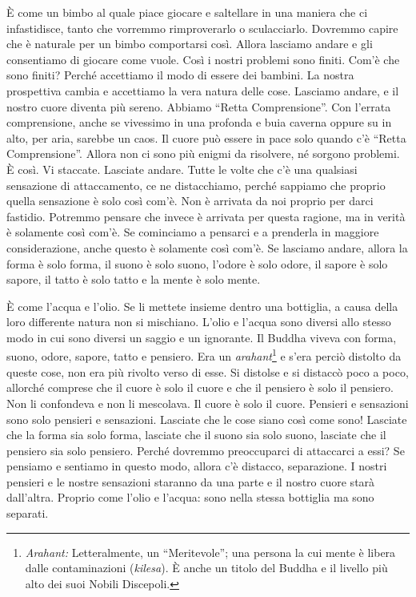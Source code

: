 È come un bimbo al quale piace giocare e saltellare in una maniera che
ci infastidisce, tanto che vorremmo rimproverarlo o sculacciarlo.
Dovremmo capire che è naturale per un bimbo comportarsi così. Allora
lasciamo andare e gli consentiamo di giocare come vuole. Così i nostri
problemi sono finiti. Com'è che sono finiti? Perché accettiamo il modo
di essere dei bambini. La nostra prospettiva cambia e accettiamo la vera
natura delle cose. Lasciamo andare, e il nostro cuore diventa più
sereno. Abbiamo ``Retta Comprensione''. Con l'errata comprensione, anche
se vivessimo in una profonda e buia caverna oppure su in alto, per aria,
sarebbe un caos. Il cuore può essere in pace solo quando c'è ``Retta
Comprensione''. Allora non ci sono più enigmi da risolvere, né sorgono
problemi. È così. Vi staccate. Lasciate andare. Tutte le volte che c'è
una qualsiasi sensazione di attaccamento, ce ne distacchiamo, perché
sappiamo che proprio quella sensazione è solo così com'è. Non è arrivata
da noi proprio per darci fastidio. Potremmo pensare che invece è
arrivata per questa ragione, ma in verità è solamente così com'è. Se
cominciamo a pensarci e a prenderla in maggiore considerazione, anche
questo è solamente così com'è. Se lasciamo andare, allora la forma è
solo forma, il suono è solo suono, l'odore è solo odore, il sapore è
solo sapore, il tatto è solo tatto e la mente è solo mente.

È come l'acqua e l'olio. Se li mettete insieme dentro una bottiglia, a
causa della loro differente natura non si mischiano. L'olio e l'acqua
sono diversi allo stesso modo in cui sono diversi un saggio e un
ignorante. Il Buddha viveva con forma, suono, odore, sapore, tatto e
pensiero. Era un \emph{arahant}\footnote{\emph{Arahant:} Letteralmente,
  un ``Meritevole''; una persona la cui mente è libera dalle
  contaminazioni (\emph{kilesa}). È anche un titolo del Buddha e il
  livello più alto dei suoi Nobili Discepoli.} e s'era perciò distolto
da queste cose, non era più rivolto verso di esse. Si distolse e si
distaccò poco a poco, allorché comprese che il cuore è solo il cuore e
che il pensiero è solo il pensiero. Non li confondeva e non li
mescolava. Il cuore è solo il cuore. Pensieri e sensazioni sono solo
pensieri e sensazioni. Lasciate che le cose siano così come sono!
Lasciate che la forma sia solo forma, lasciate che il suono sia solo
suono, lasciate che il pensiero sia solo pensiero. Perché dovremmo
preoccuparci di attaccarci a essi? Se pensiamo e sentiamo in questo
modo, allora c'è distacco, separazione. I nostri pensieri e le nostre
sensazioni staranno da una parte e il nostro cuore starà dall'altra.
Proprio come l'olio e l'acqua: sono nella stessa bottiglia ma sono
separati.

